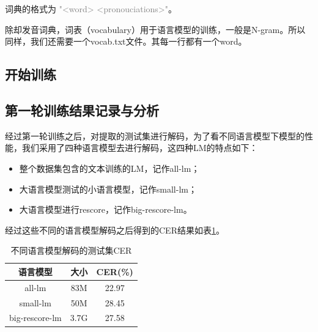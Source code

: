 词典的格式为 \textcolor{gray}{"<word> <pronouciations>"}。

除却发音词典，词表（vocabulary）用于语言模型的训练，一般是N-gram。所以同样，我们还需要一个vocab.txt文件。其每一行都有一个word。

\subsection{开始训练}



\subsection{第一轮训练结果记录与分析}
经过第一轮训练之后，对提取的测试集进行解码，为了看不同语言模型下模型的性能，我们采用了四种语言模型去进行解码，这四种LM的特点如下：
\begin{itemize}
	\item 整个数据集包含的文本训练的LM，记作all-lm；
	\item 大语言模型测试的小语言模型，记作small-lm；
	\item 大语言模型进行rescore，记作big-rescore-lm。
\end{itemize}

经过这些不同的语言模型解码之后得到的CER结果如表\ref{tab:lm-decoder}。
\begin{table}[h]
 \centering
 \caption{不同语言模型解码的测试集CER}
	 \begin{tabular*}{1\textwidth}{@{\extracolsep{\fill}}ccc}
	 \toprule
		{\bf 语言模型} & {\bf 大小} & {\bf CER(\%)} \\
	 \midrule
	   all-lm         &  83M   & 22.97    \\
	   small-lm       &  50M   & 28.45    \\
	   big-rescore-lm &  3.7G  & 27.58    \\
	 \bottomrule
	 \end{tabular*}%
 \label{tab:lm-decoder}%
\end{table}%



